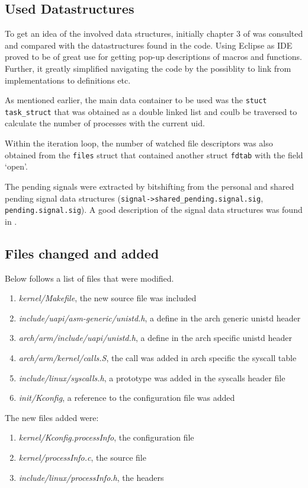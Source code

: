 \documentclass[a4paper,11pt,twoside]{article}
\begin{document}
\subsection{Used Datastructures}
To get an idea of the involved data structures, initially chapter 3 of \cite{bovetcesati2005}
was consulted and compared with the datastructures found in the code. Using Eclipse
as IDE proved to be of great use for getting pop-up descriptions of macros and
functions. Further, it greatly simplified navigating the code by the possiblity
to link from implementations to definitions etc.

As mentioned earlier, the main data container to be used was the \verb+stuct task_struct+
that was obtained as a double linked list and coulb be traversed to calculate
the number of processes with the current uid.

Within the iteration loop, the number of watched file descriptors was also obtained
from the \verb+files+ struct that contained another struct \verb+fdtab+ with the
field `open'.

The pending signals were extracted by bitshifting from the personal and shared
pending signal data structures (\verb+signal->shared_pending.signal.sig+,
\verb+pending.signal.sig+). A good description of the signal data structures
was found in \cite{love2010}.


\subsection{Files changed and added}
Below follows a list of files that were modified.
\begin{enumerate}
  \item \textit{kernel/Makefile}, the new source file was included
  \item \textit{include/uapi/asm-generic/unistd.h}, a define in the arch generic unistd header
  \item \textit{arch/arm/include/uapi/unistd.h}, a define in the arch specific unistd header
  \item \textit{arch/arm/kernel/calls.S}, the call was added in arch specific the syscall table
  \item \textit{include/linux/syscalls.h}, a prototype was added in the syscalls header file
  \item \textit{init/Kconfig}, a reference to the configuration file was added
\end{enumerate}

The new files added were:
\begin{enumerate}
  \item \textit{kernel/Kconfig.processInfo}, the configuration file
  \item \textit{kernel/processInfo.c}, the source file
  \item \textit{include/linux/processInfo.h}, the headers
\end{enumerate}
\end{document}
